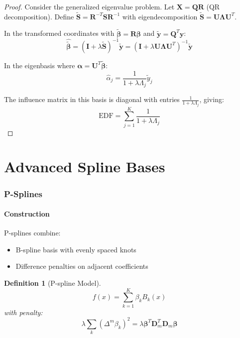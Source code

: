 \documentclass[12pt]{article}
\newtheorem{definition}{Definition}
\begin{document}
\begin{proof}
Consider the generalized eigenvalue problem. Let $\mathbf{X} = \mathbf{Q}\mathbf{R}$ (QR decomposition). Define $\tilde{\mathbf{S}} = \mathbf{R}^{-T}\mathbf{S}\mathbf{R}^{-1}$ with eigendecomposition $\tilde{\mathbf{S}} = \mathbf{U}\bm{\Lambda}\mathbf{U}^T$.

In the transformed coordinates with $\tilde{\bm{\beta}} = \mathbf{R}\bm{\beta}$ and $\tilde{\mathbf{y}} = \mathbf{Q}^T\mathbf{y}$:
\begin{equation}
\hat{\tilde{\bm{\beta}}} = (\mathbf{I} + \lambda\tilde{\mathbf{S}})^{-1}\tilde{\mathbf{y}} = (\mathbf{I} + \lambda\mathbf{U}\bm{\Lambda}\mathbf{U}^T)^{-1}\tilde{\mathbf{y}}
\end{equation}

In the eigenbasis where $\bm{\alpha} = \mathbf{U}^T\tilde{\bm{\beta}}$:
\begin{equation}
\hat{\alpha}_j = \frac{1}{1 + \lambda \Lambda_j} \tilde{y}_j
\end{equation}

The influence matrix in this basis is diagonal with entries $\frac{1}{1 + \lambda \Lambda_j}$, giving:
\begin{equation}
\text{EDF} = \sum_{j=1}^K \frac{1}{1 + \lambda \Lambda_j}
\end{equation}
\end{proof}

\part{Advanced Spline Bases}

\section{P-Splines}

\subsection{Construction}

P-splines combine:
\begin{itemize}
    \item B-spline basis with evenly spaced knots
    \item Difference penalties on adjacent coefficients
\end{itemize}

\begin{definition}[P-spline Model]
\begin{equation}
f(x) = \sum_{k=1}^K \beta_k B_k(x)
\end{equation}
with penalty:
\begin{equation}
\lambda \sum_{k} (\Delta^m \beta_k)^2 = \lambda \bm{\beta}^T \mathbf{D}_m^T \mathbf{D}_m \bm{\beta}
\end{equation}
\end{definition}
\end{document}
